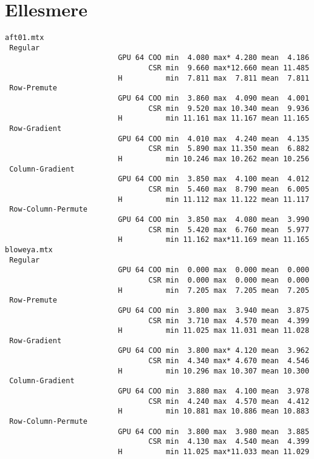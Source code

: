 \section{Ellesmere}
\label{sec:ellesmere}
{\tiny

\begin{verbatim}
aft01.mtx
 Regular
                          GPU 64 COO min  4.080 max* 4.280 mean  4.186
                                 CSR min  9.660 max*12.660 mean 11.485
                          H          min  7.811 max  7.811 mean  7.811
 Row-Premute
                          GPU 64 COO min  3.860 max  4.090 mean  4.001
                                 CSR min  9.520 max 10.340 mean  9.936
                          H          min 11.161 max 11.167 mean 11.165
 Row-Gradient
                          GPU 64 COO min  4.010 max  4.240 mean  4.135
                                 CSR min  5.890 max 11.350 mean  6.882
                          H          min 10.246 max 10.262 mean 10.256
 Column-Gradient
                          GPU 64 COO min  3.850 max  4.100 mean  4.012
                                 CSR min  5.460 max  8.790 mean  6.005
                          H          min 11.112 max 11.122 mean 11.117
 Row-Column-Permute
                          GPU 64 COO min  3.850 max  4.080 mean  3.990
                                 CSR min  5.420 max  6.760 mean  5.977
                          H          min 11.162 max*11.169 mean 11.165
bloweya.mtx
 Regular
                          GPU 64 COO min  0.000 max  0.000 mean  0.000
                                 CSR min  0.000 max  0.000 mean  0.000
                          H          min  7.205 max  7.205 mean  7.205
 Row-Premute
                          GPU 64 COO min  3.800 max  3.940 mean  3.875
                                 CSR min  3.710 max  4.570 mean  4.399
                          H          min 11.025 max 11.031 mean 11.028
 Row-Gradient
                          GPU 64 COO min  3.800 max* 4.120 mean  3.962
                                 CSR min  4.340 max* 4.670 mean  4.546
                          H          min 10.296 max 10.307 mean 10.300
 Column-Gradient
                          GPU 64 COO min  3.880 max  4.100 mean  3.978
                                 CSR min  4.240 max  4.570 mean  4.412
                          H          min 10.881 max 10.886 mean 10.883
 Row-Column-Permute
                          GPU 64 COO min  3.800 max  3.980 mean  3.885
                                 CSR min  4.130 max  4.540 mean  4.399
                          H          min 11.025 max*11.033 mean 11.029

\end{verbatim}}
